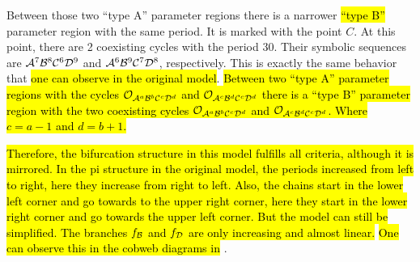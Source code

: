 Between those two ``type A'' parameter regions there is a narrower \hl{``type B''} parameter region with the same period.
It is marked with the point $C$.
At this point, there are 2 coexisting cycles with the period 30.
Their symbolic sequences are $\mathcal{A}^7\mathcal{B}^8\mathcal{C}^6\mathcal{D}^9$ and $\mathcal{A}^6\mathcal{B}^9\mathcal{C}^7\mathcal{D}^8$, respectively.
This is exactly the same behavior that \hl{one can observe in the original model}.
\hl{
	Between two ``type A'' parameter regions with the cycles $\mathcal{O}_{\mathcal{A}^a\mathcal{B}^b\mathcal{C}^c\mathcal{D}^d}$ and $\mathcal{O}_{\mathcal{A}^c\mathcal{B}^d\mathcal{C}^c\mathcal{D}^d}$ there is a ``type B'' parameter region with the two coexisting cycles $\mathcal{O}_{\mathcal{A}^a\mathcal{B}^b\mathcal{C}^c\mathcal{D}^d}$ and $\mathcal{O}_{\mathcal{A}^c\mathcal{B}^d\mathcal{C}^c\mathcal{D}^d}$.
	Where $c = a - 1$ and $d = b + 1$.
}

\hl{
	Therefore, the bifurcation structure in this model fulfills all criteria, although it is mirrored.
	In the \gls{pi} structure in the original model, the periods increased from left to right, here they increase from right to left.
	Also, the chains start in the lower left corner and go towards to the upper right corner, here they start in the lower right corner and go towards the upper left corner.
	But the model can still be simplified.
	The branches $f_{\mathcal{B}}$ and $f_{\mathcal{D}}$ are only increasing and almost linear.
}
\hl{One can observe this in the cobweb diagrams in} .
